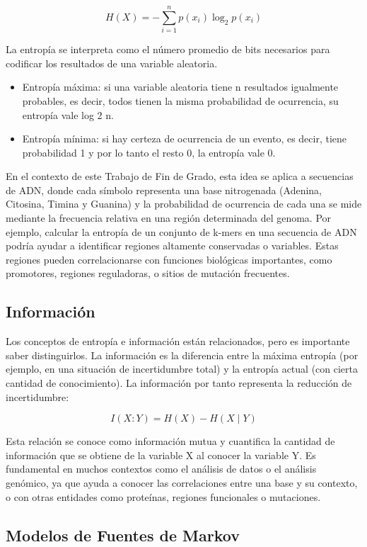 \documentclass[11pt,spanish,listoffigures,listoftables]{tfgetsinf}
\begin{document}
\[
H(X) = - \sum_{i=1}^{n} p(x_i) \log_2 p(x_i)
\]

La entropía se interpreta como el número promedio de bits necesarios para codificar los resultados de una variable aleatoria. 

\begin{itemize}
   \item Entropía máxima: si una variable aleatoria tiene n resultados igualmente probables, es decir, todos tienen la misma probabilidad de ocurrencia, su entropía vale log 2 n. 
   \item Entropía mínima: si hay certeza de ocurrencia de un evento, es decir, tiene probabilidad 1 y por lo tanto el resto 0, la entropía vale 0. \cite[p.~7]{ROB}
\end{itemize}
 
En el contexto de este Trabajo de Fin de Grado, esta idea se aplica a secuencias de ADN, donde cada símbolo representa una base nitrogenada (Adenina, Citosina, Timina y Guanina) y la probabilidad de ocurrencia de cada una se mide mediante la frecuencia relativa en una región determinada del genoma. Por ejemplo, calcular la entropía de un conjunto de k-mers en una secuencia de ADN podría ayudar a identificar regiones altamente conservadas o variables. Estas regiones pueden correlacionarse con funciones biológicas importantes, como promotores, regiones reguladoras, o sitios de mutación frecuentes. 

\subsection{Información}

Los conceptos de entropía e información están relacionados, pero es importante saber distinguirlos. La información es la diferencia entre la máxima entropía (por ejemplo, en una situación de incertidumbre total) y la entropía actual (con cierta cantidad de conocimiento). La información por tanto representa la reducción de incertidumbre:

\[
I(X:Y) = H(X) - H(X \mid Y)
\]

Esta relación se conoce como información mutua y cuantifica la cantidad de información que se obtiene de la variable X al conocer la variable Y. Es fundamental en muchos contextos como el análisis de datos o el análisis genómico, ya que ayuda a conocer las correlaciones entre una base y su contexto, o con otras entidades como proteínas, regiones funcionales o mutaciones. 


\subsection{Modelos de Fuentes de Markov}
\end{document}

